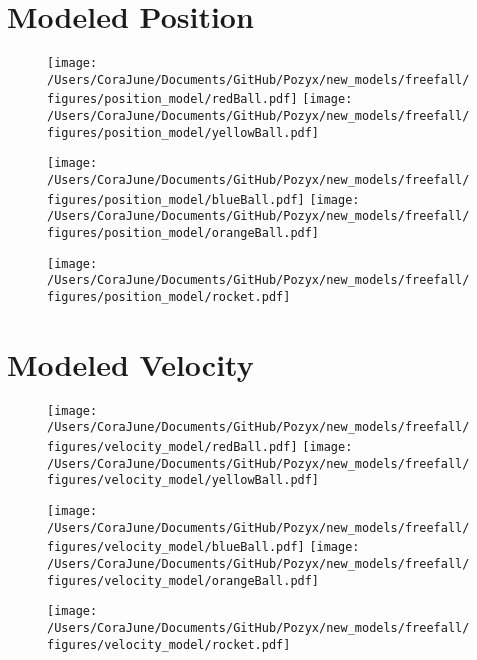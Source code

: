 \documentclass{article}
\begin{document}
\section{Modeled Position}
\begin{figure}[h!]
\begin{multicols}{2}
    \texttt{[image: /Users/CoraJune/Documents/GitHub/Pozyx/new\_models/freefall/figures/position\_model/redBall.pdf]}
    \texttt{[image: /Users/CoraJune/Documents/GitHub/Pozyx/new\_models/freefall/figures/position\_model/yellowBall.pdf]}
\end{multicols}

\begin{multicols}{2}
    \texttt{[image: /Users/CoraJune/Documents/GitHub/Pozyx/new\_models/freefall/figures/position\_model/blueBall.pdf]}
    \texttt{[image: /Users/CoraJune/Documents/GitHub/Pozyx/new\_models/freefall/figures/position\_model/orangeBall.pdf]}
\end{multicols}

\texttt{[image: /Users/CoraJune/Documents/GitHub/Pozyx/new\_models/freefall/figures/position\_model/rocket.pdf]}

\end{figure}
\newpage
\section{Modeled Velocity}
\begin{figure}[h!]
\begin{multicols}{2}
    \texttt{[image: /Users/CoraJune/Documents/GitHub/Pozyx/new\_models/freefall/figures/velocity\_model/redBall.pdf]}
    \texttt{[image: /Users/CoraJune/Documents/GitHub/Pozyx/new\_models/freefall/figures/velocity\_model/yellowBall.pdf]}
\end{multicols}

\begin{multicols}{2}
    \texttt{[image: /Users/CoraJune/Documents/GitHub/Pozyx/new\_models/freefall/figures/velocity\_model/blueBall.pdf]}
    \texttt{[image: /Users/CoraJune/Documents/GitHub/Pozyx/new\_models/freefall/figures/velocity\_model/orangeBall.pdf]}
\end{multicols}

\texttt{[image: /Users/CoraJune/Documents/GitHub/Pozyx/new\_models/freefall/figures/velocity\_model/rocket.pdf]}
\end{figure}
\newpage
\end{document}
